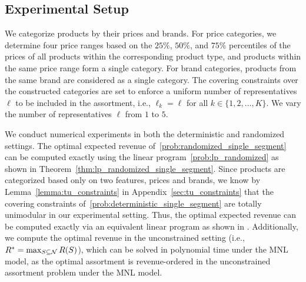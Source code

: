 \documentclass[msom,non-blindrev]{informs3} %
\theoremstyle{definition}
\begin{document}
\subsection{Experimental Setup}\label{sec:experimental_setup}

We categorize products by their prices and brands. For price categories, we determine four price ranges based on the $25\%$, $50\%$, and $75\%$ percentiles of the prices of all products within the corresponding product type, and products within the same price range form a single category. For brand categories, products from the same brand are considered as a single category. The covering constraints over the constructed categories are set to enforce a uniform number of representatives $\ell$ to be included in the assortment, i.e., $\ell_k = \ell$ for all $k \in \{1, 2, \dots, K\}$. We vary the number of representatives $\ell$ from $1$ to $5$.

We conduct numerical experiments in both the deterministic and randomized settings. The optimal expected revenue of~\eqref{prob:randomized_single_segment} can be computed exactly using the linear program~\eqref{prob:lp_randomized} as shown in Theorem~\ref{thm:lp_randomized_single_segment}. Since products are categorized based only on two features, prices and brands, we know by Lemma~\ref{lemma:tu_constraints} in Appendix~\ref{sec:tu_constraints} that the covering constraints of~\eqref{prob:deterministic_single_segment} are totally unimodular in our experimental setting. Thus, the optimal expected revenue can be computed exactly via an equivalent linear program as shown in \cite{sumida2021revenue}. Additionally, we compute the optimal revenue in the unconstrained setting (i.e., $R^*= \max_{S \subseteq {\cal N}} R(S)$), which can be solved in polynomial time under the MNL model, as the optimal assortment is revenue-ordered in the unconstrained assortment problem under the MNL model.
\end{document}
